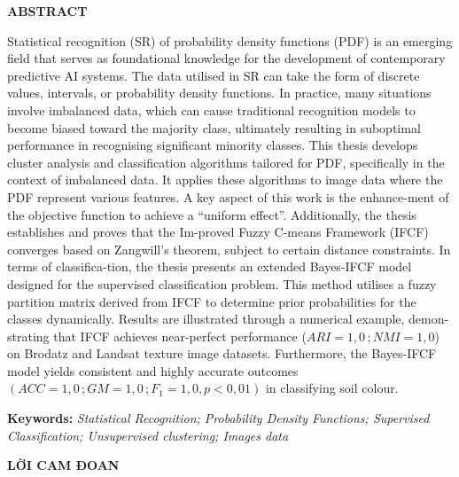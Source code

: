 \newpage
	\vspace*{50pt} %
\begin{center}
	{\fontsize{14}{0pt}\selectfont\bf ABSTRACT}
\end{center}
\vspace{20pt}
Statistical recognition (SR) of probability density functions (PDF) is an emerging field that serves as foundational knowledge for the development of contemporary predictive AI systems. The data utilised in SR can take the form of discrete values, intervals, or probability density functions. In practice, many situations involve imbalanced data, which can cause traditional recognition models to become biased toward the majority class, ultimately resulting in suboptimal performance in recognising significant minority classes.
This thesis develops cluster analysis and classification algorithms tailored for PDF, specifically in the context of imbalanced data. It applies these algorithms to image data where the PDF represent various features. A key aspect of this work is the enhance-ment of the objective function to achieve a “uniform effect”. Additionally, the thesis establishes and proves that the Im-proved Fuzzy C-means Framework (IFCF) converges based on Zangwill’s theorem, subject to certain distance constraints.
In terms of classifica-tion, the thesis presents an extended Bayes-IFCF model designed for the supervised classification problem. This method utilises a fuzzy partition matrix derived from IFCF to determine prior probabilities for the classes dynamically.
Results are illustrated through a numerical example, demon-strating that IFCF achieves near-perfect performance ($ARI = 1{,}0\,; NMI = 1{,}0$) on Brodatz and Landsat texture image datasets. Furthermore, the Bayes-IFCF model yields consistent and highly accurate outcomes $(ACC = 1{,}0\,; GM = 1{,}0\,; F_1 = 1{,}0, p<0{,}01)$  in classifying soil colour.
\begin{flushleft}\fontsize{12}{16pt}\selectfont
	\textbf{Keywords:} \textit{Statistical Recognition; Probability Density Functions; Supervised Classification; Unsupervised clustering; Images data}
\end{flushleft}


\newpage

\begin{center}
		\vspace*{50pt} %
	{\fontsize{14}{0pt}\selectfont\bf LỜI CAM ĐOAN}
\end{center}
\vspace{20pt}

